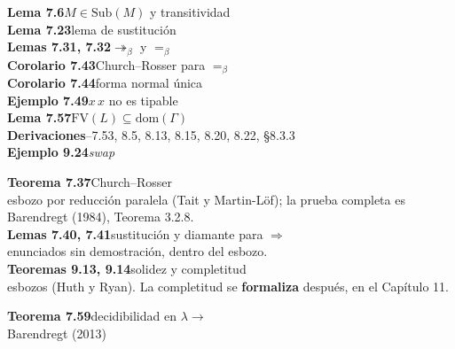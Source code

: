 \documentclass[12pt]{article}
\newcommand{\bmred}{\twoheadrightarrow_\beta}
\newcommand{\beq}{=_\beta}
\newcommand{\FV}{\mathrm{FV}}
\begin{document}
\begin{tcbraster}[raster columns=3, raster column skip=8pt, raster equal height]
\begin{tcolorbox}[colback=verde!7, colframe=verde, boxrule=1.3pt, arc=6pt,
  title={\faCheckCircle\ Demostrado en la tesis}, colbacktitle=verde, fonttitle=\bfseries\large,
  before upper=\raggedright]
\textbf{Lema 7.6}\quad $M\in\mathrm{Sub}(M)$ y transitividad\\[2pt]
\textbf{Lema 7.23}\quad lema de sustitución\\[2pt]
\textbf{Lemas 7.31, 7.32}\quad $\bmred$ y $\beq$\\[2pt]
\textbf{Corolario 7.43}\quad Church–Rosser para $\beq$\\[2pt]
\textbf{Corolario 7.44}\quad forma normal única\\[2pt]
\textbf{Ejemplo 7.49}\quad $x\,x$ no es tipable\\[2pt]
\textbf{Lema 7.57}\quad $\FV(L)\subseteq\mathrm{dom}(\Gamma)$\\[2pt]
\textbf{Derivaciones}–7.53, 8.5, 8.13, 8.15, 8.20, 8.22, §8.3.3\\[2pt]
\textbf{Ejemplo 9.24}\quad \emph{swap}
\end{tcolorbox}
\begin{tcolorbox}[colback=ambar!10, colframe=ambar, boxrule=1.3pt, arc=6pt,
  title={\faPencil*\ Esbozado o solo enunciado}, colbacktitle=ambar!90!black, fonttitle=\bfseries\large,
  before upper=\raggedright]
\textbf{Teorema 7.37}\quad Church–Rosser\\
{\small esbozo por reducción paralela (Tait y Martin-Löf); la prueba completa es
Barendregt (1984), Teorema 3.2.8.}\\[5pt]
\textbf{Lemas 7.40, 7.41}\quad sustitución y diamante para $\Rightarrow$\\
{\small enunciados sin demostración, dentro del esbozo.}\\[5pt]
\textbf{Teoremas 9.13, 9.14}\quad solidez y completitud\\
{\small esbozos (Huth y Ryan). La completitud se \textbf{formaliza} después, en el Capítulo 11.}
\end{tcolorbox}
\begin{tcolorbox}[colback=rojo!6, colframe=rojo, boxrule=1.3pt, arc=6pt,
  title={\faQuoteRight\ Citado (no lo demuestro)}, colbacktitle=rojo, fonttitle=\bfseries\large,
  before upper=\raggedright]
\textbf{Teorema 7.59}\quad decidibilidad en $\lambda{\to}$\\ {\small Barendregt (2013)}\\[3pt]

\end{tcolorbox}
\end{tcbraster}
\end{document}
